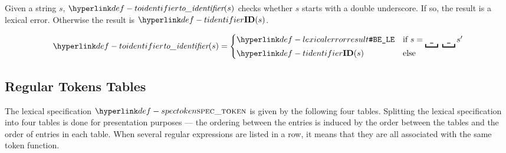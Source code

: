 \ProseParagraph
Given a string $s$, $\toidentifier(s)$ checks whether $s$ starts with a double
underscore. If so, the result is a lexical error. Otherwise the result is
$\Tidentifier(s)$.

\FormallyParagraph
\[
  \toidentifier(s) = \begin{cases}
    \LexicalError & \text{if }s = \underbracket{\texttt{ \_ } }\ \underbracket{\texttt{ \_ } } s'\\
    \Tidentifier(s) & \text{else}
  \end{cases}
\]

\subsection{Regular Tokens Tables}

\hypertarget{def-spectoken}{}
The lexical specification  $\spectoken$ is given by the following four tables.
Splitting the lexical specification into four tables is done for presentation purposes ---
the ordering between the entries is induced by the order between the tables
and the order of entries in each table.
%
When several regular expressions are listed in a row, it means that they are all associated with the same
token function.

